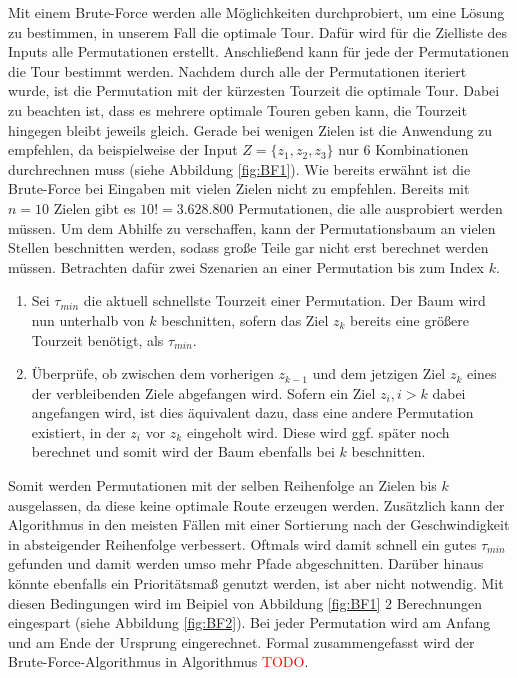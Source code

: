 \documentclass[german,version-2019-11]{uzl-thesis}
\begin{document}
Mit einem Brute-Force werden alle Möglichkeiten durchprobiert, um eine Lösung zu bestimmen, in unserem Fall die optimale Tour. Dafür wird für die Zielliste des Inputs alle Permutationen erstellt. Anschließend kann für jede der Permutationen die Tour bestimmt werden. Nachdem durch alle der Permutationen iteriert wurde, ist die Permutation mit der kürzesten Tourzeit die optimale Tour. Dabei zu beachten ist, dass es mehrere optimale Touren geben kann, die Tourzeit hingegen bleibt jeweils gleich. Gerade bei wenigen Zielen ist die Anwendung zu empfehlen, da beispielweise der Input $Z=\{z_1, z_2, z_3\}$ nur 6 Kombinationen durchrechnen muss (siehe Abbildung \ref{fig:BF1}). Wie bereits erwähnt ist die Brute-Force bei Eingaben mit vielen Zielen nicht zu empfehlen. Bereits mit $n=10$ Zielen gibt es $10! = 3.628.800$ Permutationen, die alle ausprobiert werden müssen. Um dem Abhilfe zu verschaffen, kann der Permutationsbaum an vielen Stellen beschnitten werden, sodass große Teile gar nicht erst berechnet werden müssen. Betrachten dafür zwei Szenarien an einer Permutation bis zum Index $k$.
\begin{enumerate}
\item
Sei $\tau_{min}$ die aktuell schnellste Tourzeit einer Permutation. Der Baum wird nun unterhalb von $k$ beschnitten, sofern das Ziel $z_k$ bereits eine größere Tourzeit benötigt, als $\tau_{min}$. 

\item
Überprüfe, ob zwischen dem vorherigen $z_{k-1}$ und dem jetzigen Ziel $z_{k}$ eines der verbleibenden Ziele abgefangen wird. Sofern ein Ziel $z_{i}, i>k$ dabei angefangen wird, ist dies äquivalent dazu, dass eine andere Permutation existiert, in der $z_i$ vor $z_k$ eingeholt wird. Diese wird ggf. später noch berechnet und somit wird der Baum ebenfalls bei $k$ beschnitten.

\end{enumerate}
Somit werden Permutationen mit der selben Reihenfolge an Zielen bis $k$ ausgelassen, da diese keine optimale Route erzeugen werden. Zusätzlich kann der Algorithmus in den meisten Fällen mit einer Sortierung nach der Geschwindigkeit in absteigender Reihenfolge verbessert. Oftmals wird damit schnell ein gutes $\tau_{min}$ gefunden und damit werden umso mehr Pfade abgeschnitten. Darüber hinaus könnte ebenfalls ein Prioritätsmaß genutzt werden, ist aber nicht notwendig.
Mit diesen Bedingungen wird im Beipiel von Abbildung \ref{fig:BF1} $2$ Berechnungen eingespart (siehe Abbildung \ref{fig:BF2}). Bei jeder Permutation wird am Anfang und am Ende der Ursprung eingerechnet. Formal zusammengefasst wird der Brute-Force-Algorithmus in Algorithmus \textcolor{red}{TODO}.
\end{document}
